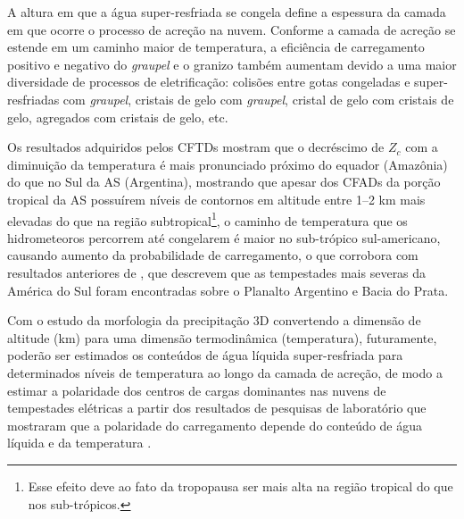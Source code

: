 
A altura em que a água super-resfriada se congela define a espessura da camada em que ocorre o processo de  acreção na nuvem. Conforme a camada de acreção se estende em um caminho maior de temperatura, a eficiência de carregamento positivo e negativo do \textit{graupel} e o granizo  também aumentam devido a uma maior diversidade de processos de eletrificação: colisões entre gotas congeladas e super-resfriadas com \textit{graupel}, cristais de gelo com \textit{graupel}, cristal de gelo com cristais de gelo, agregados com cristais de gelo,  etc. 

Os resultados adquiridos pelos CFTDs mostram que o decréscimo de $Z_c$ com a diminuição da temperatura é mais pronunciado próximo do equador (Amazônia) do que no Sul da AS (Argentina), mostrando que apesar dos CFADs da porção tropical da AS possuírem níveis de contornos em altitude entre 1--2 km mais elevadas do que na região subtropical\footnote{Esse efeito deve ao fato da tropopausa ser mais alta na região tropical do que nos sub-trópicos.}, o caminho de temperatura que os hidrometeoros percorrem até congelarem é maior no sub-trópico sul-americano, causando aumento da probabilidade de carregamento, o que corrobora com resultados anteriores de  , que descrevem que as tempestades mais severas da América do Sul foram encontradas sobre o Planalto Argentino e Bacia do Prata.
 
Com o estudo da morfologia da precipitação 3D convertendo a dimensão de altitude (km) para uma dimensão termodinâmica (temperatura), futuramente, poderão ser estimados os conteúdos de água líquida super-resfriada \cite{sekhon1971, hagen2003} para determinados níveis de temperatura ao longo da camada de acreção, de modo a estimar a polaridade dos centros de cargas dominantes nas nuvens de tempestades elétricas a partir dos resultados de pesquisas de laboratório que mostraram que a polaridade do carregamento depende do conteúdo de água líquida e da temperatura \cite{Takahashi1978,Saunders1999,saunders2008}.


